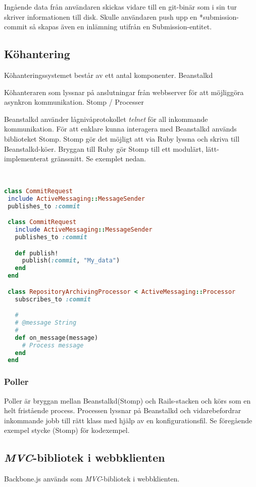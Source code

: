 Ingående data från användaren skickas vidare till en git-binär som i sin tur skriver informationen till disk. Skulle användaren push upp en *submission-commit så skapas även en inlämning utifrån en Submission-entitet.
\subsection{Köhantering}
Köhanteringssystemet består av ett antal komponenter.
Beanstalkd

Köhanteraren som lyssnar på anslutningar från webbserver för att möjliggöra asynkron kommunikation.
Stomp / Processer

Beanstalkd använder lågnivåprotokollet \emph{telnet} för all inkommande kommunikation. För att enklare kunna interagera med Beanstalkd används biblioteket Stomp. Stomp gör det möjligt att via Ruby lyssna och skriva till Beanstalkd-köer. Bryggan till Ruby gör Stomp till ett modulärt, lätt-implementerat gränssnitt. Se exemplet nedan.

\begin{lstlisting}[language=Ruby]


class CommitRequest
 include ActiveMessaging::MessageSender
 publishes_to :commit

 class CommitRequest
   include ActiveMessaging::MessageSender
   publishes_to :commit

   def publish!
     publish(:commit, "My_data")
   end
 end

 class RepositoryArchivingProcessor < ActiveMessaging::Processor
   subscribes_to :commit

   #
   # @message String
   #
   def on_message(message)
     # Process message
   end
 end
\end{lstlisting}

\subsubsection{Poller}

Poller är bryggan mellan Beanstalkd(Stomp) och Rails-stacken och körs som en helt fristående process. Processen lyssnar på Beanstalkd och vidarebefordrar inkommande jobb till rätt klass med hjälp av en konfigurationsfil. Se föregående exempel stycke (Stomp) för kodexempel.

\subsection{\emph{MVC}-bibliotek i webbklienten}
Backbone.js används som \emph{MVC}-bibliotek i webbklienten.

